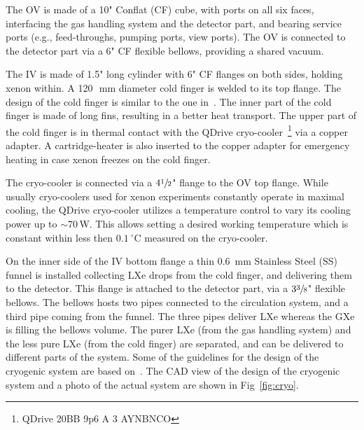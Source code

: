 The OV is made of a 10" Conflat (CF) cube, with ports on all six faces, interfacing the gas handling system and  the detector part, and bearing service ports (e.g., feed-throughs, pumping ports, 
view ports). The OV is connected to the detector part via a 6" CF flexible bellows, providing a shared vacuum.

The IV is made of 1.5" long cylinder with 6" CF flanges on both sides, holding xenon within. A 120~\,mm diameter cold finger is welded to its top flange. The design of the cold finger is similar to the one in~\cite{xe100_instr2012}. The inner part of the cold finger is made of long fins, resulting in a better heat transport.  The upper part of the cold finger is in thermal contact with the 
QDrive cryo-cooler~\footnote{QDrive 20BB 9p6 A 3 AYNBNCO} via a copper adapter.  
A cartridge-heater 
is also inserted to the copper adapter for emergency heating in case xenon freezes on the 
cold finger. 

The cryo-cooler is connected via a $4\sfrac{1}{2}$" 
flange to the OV top flange. While usually cryo-coolers used for 
xenon experiments constantly operate in maximal cooling, the QDrive cryo-cooler utilizes a 
temperature control to vary its cooling power up to $\sim$70\,W. This allows setting a desired working temperature which is constant within less then $0.1~\mathrm{^{\circ}C}$ measured on the cryo-cooler.

On the inner side of the IV bottom flange a thin 0.6~mm Stainless Steel (SS) funnel is installed 
collecting LXe drops from the cold finger, and delivering them to the  detector. This flange is attached to the detector part, via a $3\sfrac{3}{8}$" flexible bellows. The 
bellows hosts two pipes connected to the circulation system, and a third pipe coming 
from the funnel. The three pipes deliver LXe whereas the GXe is filling the bellows volume. The purer LXe (from the gas handling system) and the less pure LXe (from the cold finger) are separated, and can be delivered to different parts of the system. Some of the guidelines for the design of 
the cryogenic system are based on~\cite{Giboni:2014hia}. The CAD view of 
the design of the cryogenic system and a photo of the actual system are shown in Fig~\ref{fig:cryo}. 


